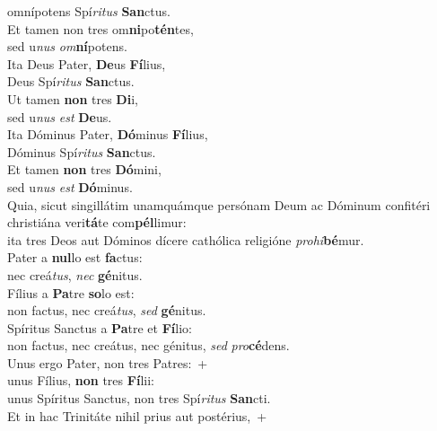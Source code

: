 \oddverse omnípotens Spí\textit{ri}\textit{tus} \textbf{San}ctus.\\
\evenverse Et tamen non tres om\textbf{ni}po\textbf{tén}tes,~\*\\
\evenverse sed u\textit{nus} \textit{om}\textbf{ní}potens.\\
\oddverse Ita Deus Pater, \textbf{De}us \textbf{Fí}lius,~\*\\
\oddverse Deus Spí\textit{ri}\textit{tus} \textbf{San}ctus.\\
\evenverse Ut tamen \textbf{non} tres \textbf{Di}i,~\*\\
\evenverse sed u\textit{nus} \textit{est} \textbf{De}us.\\
\oddverse Ita Dóminus Pater, \textbf{Dó}minus \textbf{Fí}lius,~\*\\
\oddverse Dóminus Spí\textit{ri}\textit{tus} \textbf{San}ctus.\\
\evenverse Et tamen \textbf{non} tres \textbf{Dó}mini,~\*\\
\evenverse sed u\textit{nus} \textit{est} \textbf{Dó}minus.\\
\oddverse Quia, sicut singillátim unamquámque persónam Deum ac Dóminum confitéri christiána veri\textbf{tá}te com\textbf{pél}limur:~\*\\
\oddverse ita tres Deos aut Dóminos dícere cathólica religióne \textit{pro}\textit{hi}\textbf{bé}mur.\\
\evenverse Pater a \textbf{nul}lo est \textbf{fa}ctus:~\*\\
\evenverse nec creá\textit{tus}, \textit{nec} \textbf{gé}nitus.\\
\oddverse Fílius a \textbf{Pa}tre \textbf{so}lo est:~\*\\
\oddverse non factus, nec creá\textit{tus}, \textit{sed} \textbf{gé}nitus.\\
\evenverse Spíritus Sanctus a \textbf{Pa}tre et \textbf{Fí}lio:~\*\\
\evenverse non factus, nec creátus, nec génitus, \textit{sed} \textit{pro}\textbf{cé}dens.\\
\oddverse Unus ergo Pater, non tres Patres:~+\\
\oddverse  unus Fílius, \textbf{non} tres \textbf{Fí}lii:~\*\\
\oddverse unus Spíritus Sanctus, non tres Spí\textit{ri}\textit{tus} \textbf{San}cti.\\
\evenverse Et in hac Trinitáte nihil prius aut postérius,~+\\
